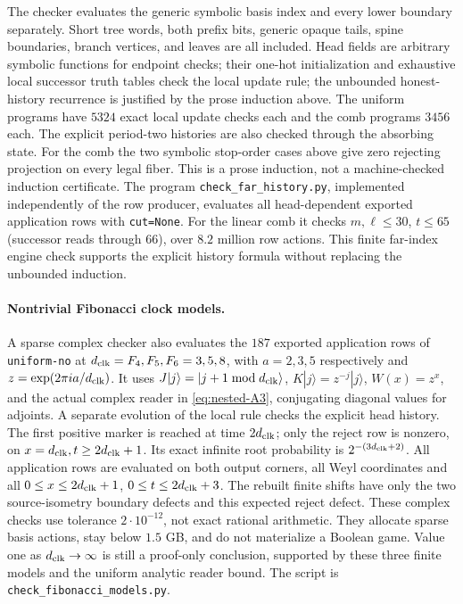 The checker evaluates the generic symbolic basis index and every
lower boundary separately. Short tree words, both prefix bits, generic
opaque tails, spine boundaries, branch vertices, and leaves are all
included. Head fields are arbitrary symbolic functions for endpoint
checks; their one-hot initialization and exhaustive local successor
truth tables check the local update rule; the unbounded
honest-history recurrence is justified by the prose induction above. The uniform
programs have $5324$ exact local update checks each and the comb
programs $3456$ each. The explicit period-two histories are also
checked through the absorbing state. For the comb the two symbolic
stop-order cases above give zero rejecting projection on every legal
fiber. This is a prose induction, not a machine-checked induction
certificate. The program \texttt{check\_far\_history.py}, implemented independently of the row producer, evaluates all head-dependent
exported application rows with \texttt{cut=None}. For the linear
comb it checks $m,\ell\le30$, $t\le65$ (successor reads through
$66$), over $8.2$ million row actions. This finite far-index engine
check supports the explicit history formula without replacing the
unbounded induction.

\paragraph{Nontrivial Fibonacci clock models.}
A sparse complex checker also evaluates the $187$ exported application rows of
\texttt{uniform-no} at ${d_{\rm clk}}=F_4,F_5,F_6=3,5,8$, with
$a=2,3,5$ respectively and $z=\exp(2\pi ia/{d_{\rm clk}})$.
It uses $J|j\rangle=|j+1\bmod {d_{\rm clk}}\rangle$,
$K|j\rangle=z^{-j}|j\rangle$, $W(x)=z^x$, and the actual
complex reader in \eqref{eq:nested-A3}, conjugating diagonal values for adjoints.
A separate evolution of the local rule checks the explicit head
history. The first positive marker is reached at time $2{d_{\rm clk}}$;
only the reject row is nonzero, on $x={d_{\rm clk}},t\ge2{d_{\rm clk}}+1$.
Its exact infinite root probability is $2^{-(3{d_{\rm clk}}+2)}$.
All application rows are evaluated on both output corners, all
Weyl coordinates and all $0\le x\le2{d_{\rm clk}}+1$, $0\le t\le2{d_{\rm clk}}+3$.
The rebuilt finite shifts have only the two source-isometry
boundary defects and this expected reject defect. These complex
checks use tolerance $2\cdot10^{-12}$, not exact rational
arithmetic. They allocate sparse basis actions, stay below $1.5$ GB,
and do not materialize a Boolean game. Value one as ${d_{\rm clk}}\to\infty$
is still a proof-only conclusion, supported by these three finite
models and the uniform analytic reader bound. The script is
\texttt{check\_\allowbreak fibonacci\_\allowbreak models.py}.

